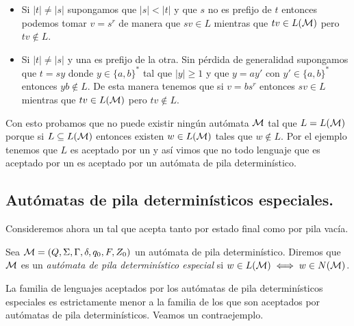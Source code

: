 \documentclass[tesis.tex]{subfiles}
\begin{document}
\begin{ej}
\begin{itemize}
		\item Si $|t|\neq |s|$ supongamos que $|s| < |t|$ y que $s$ no es prefijo de $t$ entonces  podemos tomar $v = s^r$ de manera que $sv \in L$ mientras que $tv \in L(\cal M)$ pero $tv \notin L$.
		
		\item Si $|t|\neq |s|$ y una es prefijo de la otra. 
		Sin pérdida de generalidad supongamos que $t=sy$ donde $y \in \{a,b\}^*$ tal que $|y| \ge 1$ y que $y = ay'$ con $y' \in \{a,b\}^*$ entonces $yb \notin L$.  
		De esta manera tenemos que si $v=bs^r$ entonces $sv \in L$ mientras que $tv \in L(\cal M)$ pero $tv \notin L$.		
	\end{itemize}
	
	Con esto probamos que no puede existir ningún autómata $\cal M$ tal que $L = L(\cal M)$ porque si $L \subseteq L(\cal M)$ entonces existen $w \in L(\cal M)$ tales que $w \notin L$.
	Por el ejemplo \label{ej_ic_palindromos} tenemos que $L$ es aceptado por un \APND y así vimos que no todo lenguaje que es aceptado por un \APND es aceptado por un autómata de pila determinístico.
	
\end{ej}

\subsection{Autómatas de pila determinísticos especiales.} 
Consideremos ahora un \APD tal que acepta tanto por estado final como por pila vacía. 

\begin{deff}
	Sea ${\cal {M}} = (Q,\Sigma, \Gamma, \delta, q_0, F, Z_0)$ un autómata de pila determinístico. 
	Diremos que $\cal M$ es un \emph{autómata de pila determinístico especial} si $w \in L({\cal M}) \iff w \in N(\cal M)$.
\end{deff}

La familia de lenguajes aceptados por los autómatas de pila determinísticos especiales es estrictamente menor a la familia de los que son aceptados por autómatas de pila determinísticos.
Veamos un contraejemplo.
\end{document}
